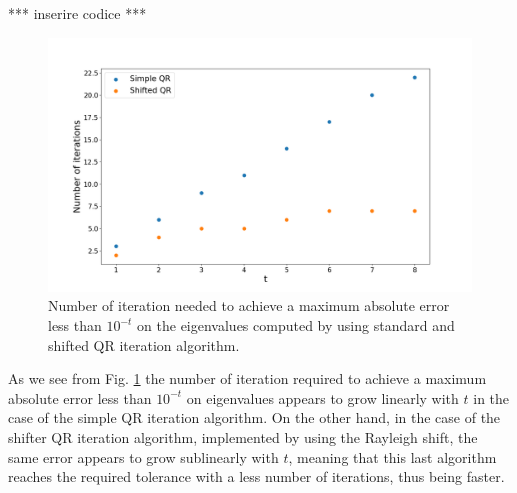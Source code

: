 \documentclass[a4paper,11pt]{article}
\begin{document}
*** inserire codice ***\\

\begin{figure}[H]
	\centering
	\includegraphics[scale=0.40]{Plot/Plot_QR_Standard_Rayleigh.png}
	\caption{Number of iteration needed to achieve a maximum absolute error less than $10^{-t}$ on the eigenvalues computed by using standard and shifted QR iteration algorithm.}
	\label{Fig:Num_iter_with_t}
\end{figure}

\noindent As we see from Fig. \ref{Fig:Num_iter_with_t}  the number of iteration required to achieve a maximum absolute error less than $10^{-t}$ on eigenvalues appears to grow linearly with $t$ in the case of the simple QR iteration algorithm. On the other hand, in the case of the shifter QR iteration algorithm, implemented by using the Rayleigh shift, the same error appears to grow sublinearly with $t$, meaning that this last algorithm reaches the required tolerance with a less number of iterations, thus being faster.

	
\end{document}
